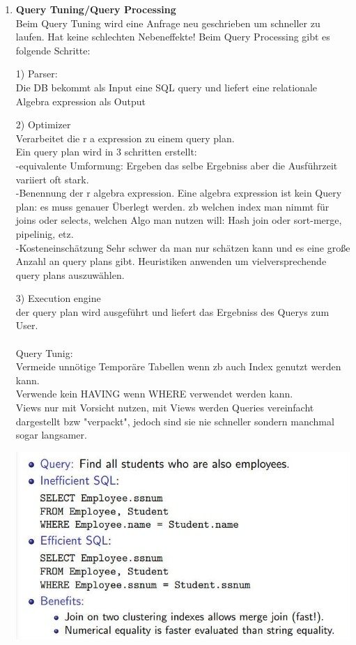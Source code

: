 \documentclass[12pt]{article}\pagestyle{myheadings}
\theoremstyle{plain}
\begin{document}
\begin{enumerate}
\item \textbf{Query Tuning/Query Processing} \\
Beim Query Tuning wird eine Anfrage neu geschrieben um schneller zu laufen.
Hat keine schlechten Nebeneffekte!
Beim Query Processing gibt es folgende Schritte:
\item[1)]Parser:\\
Die DB bekommt als Input eine SQL query und liefert eine relationale Algebra expression als Output\\
\item[2)]Optimizer\\
Verarbeitet die r a expression zu einem query plan.
\\
Ein query plan wird in 3 schritten erstellt:\\
-equivalente Umformung: Ergeben das selbe Ergebniss aber die Ausführzeit variiert oft stark.\\
-Benennung der r algebra expression. Eine algebra expression ist kein Query plan: es muss genauer Überlegt werden. zb welchen index man nimmt für joins oder selects, welchen Algo man nutzen will: Hash join oder sort-merge, pipelinig, etz.\\
-Kosteneinschätzung
Sehr schwer da man nur schätzen kann und es eine große Anzahl an query plans gibt.
Heuristiken anwenden um vielversprechende query plans auszuwählen.\\
\item[3)]Execution engine\\
der query plan wird ausgeführt und liefert das Ergebniss des Querys zum User.\\ \\
\newpage
Query Tunig:\\
Vermeide unnötige Temporäre Tabellen wenn zb auch Index genutzt werden kann.\\
Verwende kein HAVING wenn WHERE verwendet werden kann.\\
Views nur mit Vorsicht nutzen, mit Views werden Queries vereinfacht dargestellt bzw "verpackt", jedoch sind sie nie schneller sondern manchmal sogar langsamer.
\begin{center}
\includegraphics[scale=0.8]{query_tuning.jpg}
\end{center}


\end{enumerate}
\end{document}
